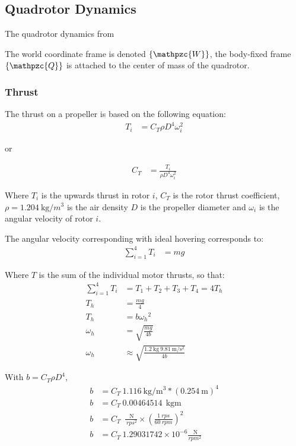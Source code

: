 \documentclass[letterpaper, 12pt]{article}
\begin{document}
\subsection{Quadrotor Dynamics}\label{sec:ref_quad_model}
The quadrotor dynamics from \cite{quadrotor_model}

The world coordinate frame is denoted $\lbrace\mathpzc{W}\rbrace$, the body-fixed frame $\lbrace\mathpzc{Q}\rbrace$ is attached to the center of mass of the quadrotor. 

\subsubsection{Thrust}\label{sec:thrust}

The thrust on a propeller is based on the following equation\cite{uav_handbook}\cite{propeller_thesis}:
\begin{align}
 T_i &= C_T \rho D^4 \omega_i^2
\end{align}

or

\begin{align}
 C_T &= \frac{T_i}{\rho D^4 \omega_i^2}
\end{align}


Where $T_i$ is the upwards thrust in rotor $i$, $C_T$ is the rotor thrust coefficient, $\rho = \SI{1.204}{\kilo\gram/m^3}$ is the air density $D$ is the propeller diameter and $\omega_i$ is the angular velocity of rotor $i$. 

The angular velocity corresponding with ideal hovering corresponds to:
\begin{align}
\sum\limits_{i=1}^{4} T_i &= m g
\end{align}

Where $T$ is the sum of the individual motor thrusts, so that:
\begin{align}
 \sum\limits_{i=1}^{4} T_i &= T_1 + T_2 + T_3 + T_4 = 4 T_h\\
 T_h &= \frac{m g}{4}\\
 T_h &= b {\omega_h}^2\\
 \omega_h &= \sqrt{\frac{m g}{4 b}}\\
 \omega_h &\approx \sqrt{\frac{\SI{1.2}{\kilo\gram}\ \SI{9.81}{\meter/\second^2}}{4 b}}
\end{align}

With $b = C_T \rho D^4$,
\begin{align} 
 b &= C_T\ \SI{1.116}{\kilo\gram/\meter^3} * (\SI{0.254}{\meter})^4 \\
 b &= C_T\ 0.00464514\ \SI{}{\kilo\gram\meter} \\
 b &= C_T\ \ \frac{\SI{}{\newton}}{\SI{}{rps^2}} \times \left(\frac{1\ rps}{60\ rpm} \right)^2\\
 b &= C_T\ 1.29031742 \times 10^{-6} \frac{\SI{}{\newton}}{rpm^2}
\end{align}
\end{document}
